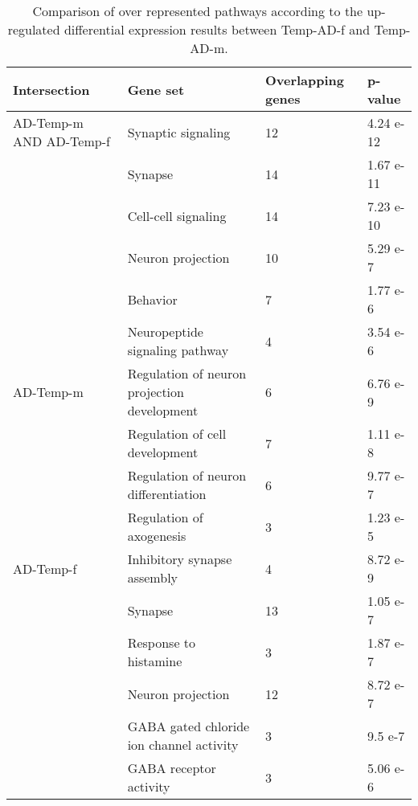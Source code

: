 \begin{table}[!ht]
\centering
\caption{Comparison of over represented pathways according to the up-regulated differential expression results between Temp-AD-f and Temp-AD-m.}
\begin{tabularx}{11cm}{L{2cm}L{2.5cm}L{3cm}C{1.5cm}}
\toprule
\textbf{Intersection} & \textbf{Gene set} & \textbf{Overlapping genes} & \textbf{p-value} \\
\midrule
AD-Temp-m AND AD-Temp-f & Synaptic signaling                       & 12 & 4.24 e-12 \\
                        & Synapse                                  & 14 & 1.67 e-11 \\
                        & Cell-cell signaling                      & 14 & 7.23 e-10 \\
                        & Neuron projection                        & 10 & 5.29 e-7  \\
                        & Behavior                                 & 7  & 1.77 e-6  \\
                        & Neuropeptide signaling pathway           & 4  & 3.54 e-6  \\
AD-Temp-m                              & Regulation of neuron projection development & 6                          & 6.76 e-9         \\
                        & Regulation of cell development           & 7  & 1.11 e-8  \\
                        & Regulation of neuron differentiation     & 6  & 9.77 e-7  \\
                        & Regulation of axogenesis                 & 3  & 1.23 e-5  \\
AD-Temp-f               & Inhibitory synapse assembly              & 4  & 8.72 e-9  \\
                        & Synapse                                  & 13 & 1.05 e-7  \\
                        & Response to histamine                    & 3  & 1.87 e-7  \\
                        & Neuron projection                        & 12 & 8.72 e-7  \\
                        & GABA gated chloride ion channel activity & 3  & 9.5 e-7   \\
                        & GABA receptor activity                   & 3  & 5.06 e-6  \\
\bottomrule

\end{tabularx}
\end{table}


